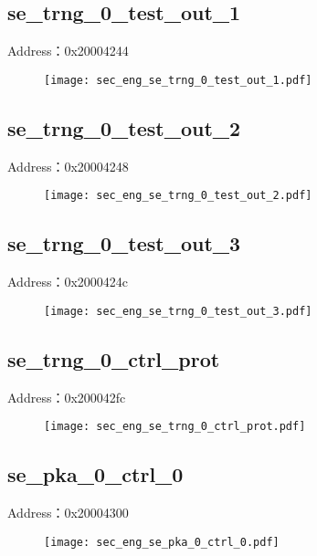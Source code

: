 \subsection{se\_trng\_0\_test\_out\_1}
\label{sec_eng-se-trng-0-test-out-1}
Address：0x20004244
 \begin{figure}[H]
\texttt{[image: sec\_eng\_se\_trng\_0\_test\_out\_1.pdf]}
\end{figure}

\subsection{se\_trng\_0\_test\_out\_2}
\label{sec_eng-se-trng-0-test-out-2}
Address：0x20004248
 \begin{figure}[H]
\texttt{[image: sec\_eng\_se\_trng\_0\_test\_out\_2.pdf]}
\end{figure}

\subsection{se\_trng\_0\_test\_out\_3}
\label{sec_eng-se-trng-0-test-out-3}
Address：0x2000424c
 \begin{figure}[H]
\texttt{[image: sec\_eng\_se\_trng\_0\_test\_out\_3.pdf]}
\end{figure}

\subsection{se\_trng\_0\_ctrl\_prot}
\label{sec_eng-se-trng-0-ctrl-prot}
Address：0x200042fc
 \begin{figure}[H]
\texttt{[image: sec\_eng\_se\_trng\_0\_ctrl\_prot.pdf]}
\end{figure}

\subsection{se\_pka\_0\_ctrl\_0}
\label{sec_eng-se-pka-0-ctrl-0}
Address：0x20004300
 \begin{figure}[H]
\texttt{[image: sec\_eng\_se\_pka\_0\_ctrl\_0.pdf]}
\end{figure}

